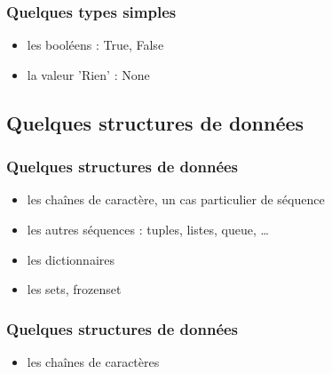 \begin{frame}[fragile]
  \frametitle{Quelques types simples}
  \begin{itemize}
    \item les booléens : \alert{True, False}
    \item la valeur 'Rien' : \alert{None}
  \end{itemize}
\begin{ipython}
\end{ipython}
\end{frame}


\subsection{Quelques structures de données}
\begin{frame}
  \frametitle{Quelques structures de données}
  \begin{itemize}
    \item<1-> les chaînes de caractère, un cas particulier de séquence
    \item<2-> les autres séquences : tuples, listes, queue, \ldots
    \item<3-> les dictionnaires
    \item<4-> les sets, frozenset
  \end{itemize}
\end{frame}

\begin{frame}[fragile]
  \frametitle{Quelques structures de données}
  \begin{itemize}
    \item les chaînes de caractères
  \end{itemize}
\begin{ipython}
\end{ipython}
\end{frame}

